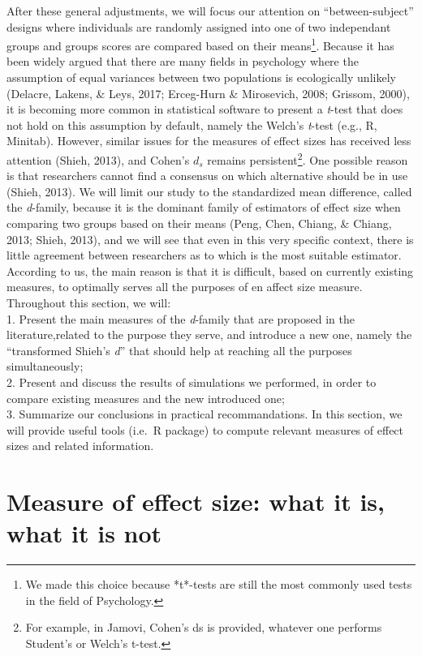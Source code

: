 \documentclass[
  man,floatsintext]{apa6}
\begin{document}
After these general adjustments, we will focus our attention on \enquote{between-subject} designs where individuals are randomly assigned into one of two independant groups and groups scores are compared based on their means\footnote{We made this choice because *t*-tests are still the most commonly used tests in the field of Psychology.}. Because it has been widely argued that there are many fields in psychology where the assumption of equal variances between two populations is ecologically unlikely (Delacre, Lakens, \& Leys, 2017; Erceg-Hurn \& Mirosevich, 2008; Grissom, 2000), it is becoming more common in statistical software to present a \emph{t}-test that does not hold on this assumption by default, namely the Welch's \emph{t}-test (e.g., R, Minitab). However, similar issues for the measures of effect sizes has received less attention (Shieh, 2013), and Cohen's \(d_s\) remains persistent\footnote{For example, in Jamovi, Cohen's ds is provided, whatever one performs Student's or Welch's t-test.}. One possible reason is that researchers cannot find a consensus on which alternative should be in use (Shieh, 2013). We will limit our study to the standardized mean difference, called the \emph{d}-family, because it is the dominant family of estimators of effect size when comparing two groups based on their means (Peng, Chen, Chiang, \& Chiang, 2013; Shieh, 2013), and we will see that even in this very specific context, there is little agreement between researchers as to which is the most suitable estimator. According to us, the main reason is that it is difficult, based on currently existing measures, to optimally serves all the purposes of en affect size measure. Throughout this section, we will:\\
1. Present the main measures of the \emph{d}-family that are proposed in the literature,related to the purpose they serve, and introduce a new one, namely the \enquote{transformed Shieh's \emph{d}} that should help at reaching all the purposes simultaneously;\\
2. Present and discuss the results of simulations we performed, in order to compare existing measures and the new introduced one;\\
3. Summarize our conclusions in practical recommandations. In this section, we will provide useful tools (i.e.~R package) to compute relevant measures of effect sizes and related information.

\hypertarget{measure-of-effect-size-what-it-is-what-it-is-not}{%
\section{Measure of effect size: what it is, what it is not}\label{measure-of-effect-size-what-it-is-what-it-is-not}}
\end{document}
